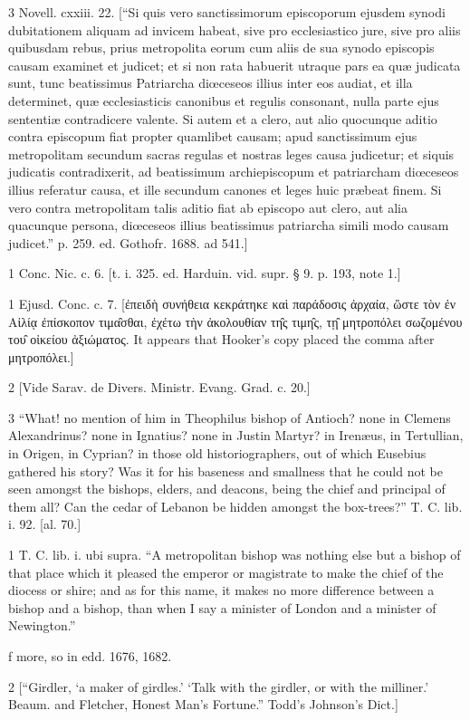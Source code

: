3
Novell. cxxiii. 22. [“Si quis vero sanctissimorum episcoporum ejusdem synodi dubitationem aliquam ad invicem habeat, sive pro ecclesiastico jure, sive pro aliis quibusdam rebus, prius metropolita eorum cum aliis de sua synodo episcopis causam examinet et judicet; et si non rata habuerit utraque pars ea quæ judicata sunt, tunc beatissimus Patriarcha diœceseos illius inter eos audiat, et illa determinet, quæ ecclesiasticis canonibus et regulis consonant, nulla parte ejus sententiæ contradicere valente. Si autem et a clero, aut alio quocunque aditio contra episcopum fiat propter quamlibet causam; apud sanctissimum ejus metropolitam secundum sacras regulas et nostras leges causa judicetur; et siquis judicatis contradixerit, ad beatissimum archiepiscopum et patriarcham diœceseos illius referatur causa, et ille secundum canones et leges huic præbeat finem. Si vero contra metropolitam talis aditio fiat ab episcopo aut clero, aut alia quacunque persona, diœceseos illius beatissimus patriarcha simili modo causam judicet.” p. 259. ed. Gothofr. 1688. ad 541.]

1
Conc. Nic. c. 6. [t. i. 325. ed. Harduin. vid. supr. § 9. p. 193, note 1.]

1
Ejusd. Conc. c. 7. [ἐπειδὴ συνήθεια κεκράτηκε καὶ παράδοσις ἀρχαία, ὥστε τὸν ἐν Αἰλίᾳ ἐπίσκοπον τιμα̑σθαι, ἐχέτω τὴν ἀκολουθίαν τη̑ς τιμη̑ς, τῃ̑ μητροπόλει σωζομένου του̑ οἰκείου ἀξιώματος. It appears that Hooker’s copy placed the comma after μητροπόλει.]

2
[Vide Sarav. de Divers. Ministr. Evang. Grad. c. 20.]

3
“What! no mention of him in Theophilus bishop of Antioch? none in Clemens Alexandrinus? none in Ignatius? none in Justin Martyr? in Irenæus, in Tertullian, in Origen, in Cyprian? in those old historiographers, out of which Eusebius gathered his story? Was it for his baseness and smallness that he could not be seen amongst the bishops, elders, and deacons, being the chief and principal of them all? Can the cedar of Lebanon be hidden amongst the box-trees?” T. C. lib. i. 92. [al. 70.]

1
T. C. lib. i. ubi supra. “A metropolitan bishop was nothing else but a bishop of that place which it pleased the emperor or magistrate to make the chief of the diocess or shire; and as for this name, it makes no more difference between a bishop and a bishop, than when I say a minister of London and a minister of Newington.”

f
more, so in edd. 1676, 1682.

2
[“Girdler, ‘a maker of girdles.’ ‘Talk with the girdler, or with the milliner.’ Beaum. and Fletcher, Honest Man’s Fortune.” Todd’s Johnson’s Dict.]

